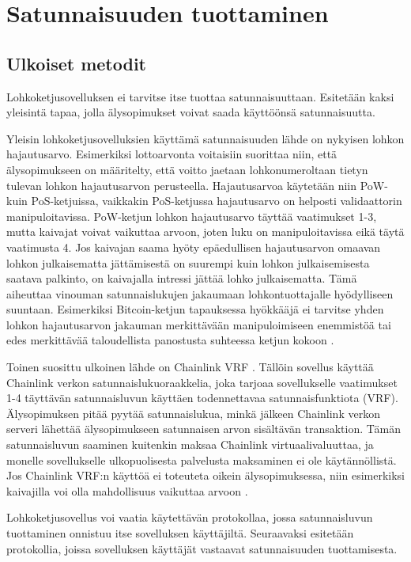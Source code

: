 \chapter{Satunnaisuuden tuottaminen\label{results}}

\section{Ulkoiset metodit}

Lohkoketjusovelluksen ei tarvitse itse tuottaa satunnaisuuttaan. Esitetään kaksi yleisintä tapaa, jolla älysopimukset voivat saada käyttöönsä satunnaisuutta.

Yleisin lohkoketjusovelluksien käyttämä satunnaisuuden lähde on nykyisen lohkon hajautusarvo. Esimerkiksi lottoarvonta voitaisiin suorittaa niin, että älysopimukseen on määritelty, että voitto jaetaan lohkonumeroltaan tietyn tulevan lohkon hajautusarvon perusteella. Hajautusarvoa käytetään niin PoW- kuin PoS-ketjuissa, vaikkakin PoS-ketjussa hajautusarvo on helposti validaattorin manipuloitavissa. PoW-ketjun lohkon hajautusarvo täyttää vaatimukset 1-3, mutta kaivajat voivat vaikuttaa arvoon, joten luku on manipuloitavissa eikä täytä vaatimusta 4. Jos kaivajan saama hyöty epäedullisen hajautusarvon omaavan lohkon julkaisematta jättämisestä on suurempi kuin lohkon julkaisemisesta saatava palkinto, on kaivajalla intressi jättää lohko julkaisematta. Tämä aiheuttaa vinouman satunnaislukujen jakaumaan lohkontuottajalle hyödylliseen suuntaan. Esimerkiksi Bitcoin-ketjun tapauksessa hyökkääjä ei tarvitse yhden lohkon hajautusarvon jakauman merkittävään manipuloimiseen enemmistöä tai edes merkittävää taloudellista panostusta suhteessa ketjun kokoon \cite{pierrot_malleability_2018}.

Toinen suosittu ulkoinen lähde on Chainlink VRF \cite{noauthor_verifiable_2020}. Tällöin sovellus käyttää Chainlink verkon satunnaislukuoraakkelia, joka tarjoaa sovellukselle vaatimukset 1-4 täyttävän satunnaisluvun käyttäen todennettavaa satunnaisfunktiota (VRF). Älysopimuksen pitää pyytää satunnaislukua, minkä jälkeen Chainlink verkon serveri lähettää älysopimukseen satunnaisen arvon sisältävän transaktion. Tämän satunnaisluvun saaminen kuitenkin maksaa Chainlink virtuaalivaluuttaa, ja monelle sovellukselle ulkopuolisesta palvelusta maksaminen ei ole käytännöllistä. Jos Chainlink VRF:n käyttöä ei toteuteta oikein älysopimuksessa, niin esimerkiksi kaivajilla voi olla mahdollisuus vaikuttaa arvoon \cite{noauthor_vrf_nodate}.

Lohkoketjusovellus voi vaatia käytettävän protokollaa, jossa satunnaisluvun tuottaminen onnistuu itse sovelluksen käyttäjiltä. Seuraavaksi esitetään protokollia, joissa sovelluksen käyttäjät vastaavat satunnaisuuden tuottamisesta.

